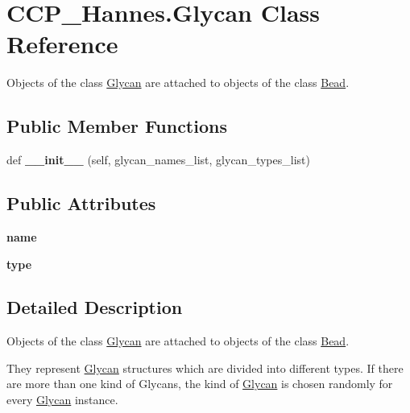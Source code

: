 \hypertarget{class_c_c_p___hannes_1_1_glycan}{}\section{C\+C\+P\+\_\+\+Hannes.\+Glycan Class Reference}
\label{class_c_c_p___hannes_1_1_glycan}


Objects of the class \mbox{\hyperlink{class_c_c_p___hannes_1_1_glycan}{Glycan}} are attached to objects of the class \mbox{\hyperlink{class_c_c_p___hannes_1_1_bead}{Bead}}.  


\subsection*{Public Member Functions}
\begin{DoxyCompactItemize}
\item 
\mbox{\label{class_c_c_p___hannes_1_1_glycan_aafa365a1d9370f65fed0715a7d1f6a54}} 
def {\bfseries \+\_\+\+\_\+init\+\_\+\+\_\+} (self, glycan\+\_\+names\+\_\+list, glycan\+\_\+types\+\_\+list)
\end{DoxyCompactItemize}
\subsection*{Public Attributes}
\begin{DoxyCompactItemize}
\item 
\mbox{\label{class_c_c_p___hannes_1_1_glycan_a0c2be33e3ba5593a639bd47f24bcc1c4}} 
{\bfseries name}
\item 
\mbox{\label{class_c_c_p___hannes_1_1_glycan_a097d262d25212abbc886ff25d90f10cc}} 
{\bfseries type}
\end{DoxyCompactItemize}


\subsection{Detailed Description}
Objects of the class \mbox{\hyperlink{class_c_c_p___hannes_1_1_glycan}{Glycan}} are attached to objects of the class \mbox{\hyperlink{class_c_c_p___hannes_1_1_bead}{Bead}}. 

They represent \mbox{\hyperlink{class_c_c_p___hannes_1_1_glycan}{Glycan}} structures which are divided into different types. If there are more than one kind of Glycans, the kind of \mbox{\hyperlink{class_c_c_p___hannes_1_1_glycan}{Glycan}} is chosen randomly for every \mbox{\hyperlink{class_c_c_p___hannes_1_1_glycan}{Glycan}} instance.


